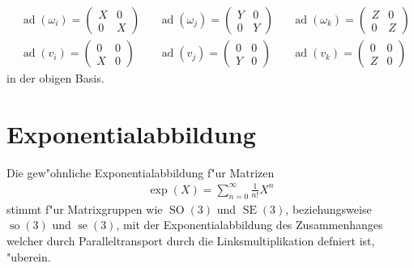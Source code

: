 \documentclass[paper=A4, twoside, chapterprefix=true, bibliography=totoc, headsepline]{scrbook}
\DeclareMathOperator{\ad}{ad}
\DeclareMathOperator{\se}{se}
\DeclareMathOperator{\so}{so}
\DeclareMathOperator{\SE}{SE}
\DeclareMathOperator{\SO}{SO} %
\theoremstyle{nonumberbreak}
\theoremstyle{emptybreak}
\theoremstyle{break}
\begin{document}
\begin{align*}
	&\ad(\omega_i) =
	\begin{pmatrix}
		X & 0 \\
		0 & X
	\end{pmatrix}
	&&
	\ad(\omega_j) =
	\begin{pmatrix}
		Y & 0 \\
		0 & Y
	\end{pmatrix}
	&&
	\ad(\omega_k) =
	\begin{pmatrix}
		Z & 0 \\
		0 & Z
	\end{pmatrix}
	\\
	&\ad(v_i) =
	\begin{pmatrix}
		0 & 0 \\
		X & 0
	\end{pmatrix}
	&&
	\ad(v_j) =
	\begin{pmatrix}
		0 & 0 \\
		Y & 0
	\end{pmatrix}
	&&
	\ad(v_k) =
	\begin{pmatrix}
		0 & 0 \\
		Z & 0
	\end{pmatrix}
\end{align*}
in der obigen Basis.

\section{Exponentialabbildung}

Die gew"ohnliche Exponentialabbildung f"ur Matrizen
\begin{align*}
	\exp(X) = \sum_{n=0}^{\infty} \frac{1}{n!} X^n
\end{align*}
stimmt f"ur Matrixgruppen wie $\SO(3)$ und $\SE(3)$, beziehungsweise $\so(3)$ und $\se(3)$, mit der Exponentialabbildung des Zusammenhanges welcher durch Paralleltransport durch die Linksmultiplikation defniert ist, "uberein.
\end{document}
